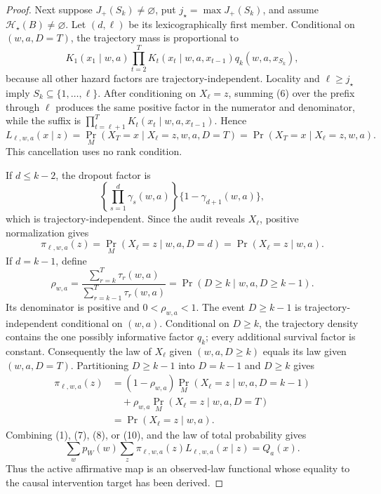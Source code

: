 \documentclass{article}
\begin{document}
\begin{proof}
Next suppose \(J_+(S_k)\ne\varnothing\), put
\(j_\star=\max J_+(S_k)\), and assume
\(\mathcal H_\star(B)\ne\varnothing\).  Let \((d,\ell)\) be its lexicographically first member.  Conditional on \((w,a,D=T)\), the trajectory mass is proportional to
\[
K_1(x_1\mid w,a)\prod_{t=2}^T K_t(x_t\mid w,a,x_{t-1})
q_k(w,a,x_{S_k}),
\tag{6}
\]
because all other hazard factors are trajectory-independent.  Locality and
\(\ell\ge j_\star\) imply \(S_k\subseteq\{1,\ldots,\ell\}\).  After conditioning on \(X_\ell=z\), summing (6) over the prefix through \(\ell\) produces the same positive factor in the numerator and denominator, while the suffix is
\(\prod_{t=\ell+1}^T K_t(x_t\mid w,a,x_{t-1})\).  Hence
\[
L_{\ell,w,a}(x\mid z)
=\Pr_M(X_T=x\mid X_\ell=z,w,a,D=T)
=\Pr(X_T=x\mid X_\ell=z,w,a).
\tag{7}
\]
This cancellation uses no rank condition.

If \(d\le k-2\), the dropout factor is
\[
\left\{\prod_{s=1}^d\gamma_s(w,a)\right\}
\{1-\gamma_{d+1}(w,a)\},
\]
which is trajectory-independent.  Since the audit reveals \(X_\ell\), positive normalization gives
\[
\pi_{\ell,w,a}(z)
=\Pr_M(X_\ell=z\mid w,a,D=d)
=\Pr(X_\ell=z\mid w,a).
\tag{8}
\]
If \(d=k-1\), define
\[
\rho_{w,a}=
\frac{\sum_{r=k}^T\tau_r(w,a)}{\sum_{r=k-1}^T\tau_r(w,a)}
=\Pr(D\ge k\mid w,a,D\ge k-1).
\tag{9}
\]
Its denominator is positive and \(0<\rho_{w,a}<1\).  The event
\(D\ge k-1\) is trajectory-independent conditional on \((w,a)\).  Conditional on \(D\ge k\), the trajectory density contains the one possibly informative factor \(q_k\); every additional survival factor is constant.  Consequently the law of \(X_\ell\) given \((w,a,D\ge k)\) equals its law given \((w,a,D=T)\).  Partitioning \(D\ge k-1\) into \(D=k-1\) and \(D\ge k\) gives
\[
\begin{aligned}
\pi_{\ell,w,a}(z)
&=(1-\rho_{w,a})\Pr_M(X_\ell=z\mid w,a,D=k-1)\\
&\quad+\rho_{w,a}\Pr_M(X_\ell=z\mid w,a,D=T)\\
&=\Pr(X_\ell=z\mid w,a).
\end{aligned}
\tag{10}
\]
Combining (1), (7), (8), or (10), and the law of total probability gives
\[
\sum_w p_W(w)\sum_z
\pi_{\ell,w,a}(z)L_{\ell,w,a}(x\mid z)=Q_a(x).
\tag{11}
\]
Thus the active affirmative map is an observed-law functional whose equality to the causal intervention target has been derived.


\end{proof}
\end{document}
